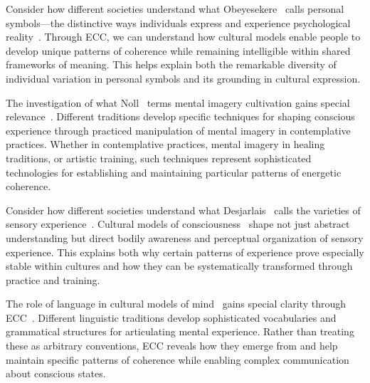 Consider how different societies understand what Obeyesekere~\cite{obeyesekere1981medusa} calls personal symbols—the distinctive ways individuals express and experience psychological reality~\cite{csordas1990embodiment}. Through ECC, we can understand how cultural models enable people to develop unique patterns of coherence while remaining intelligible within shared frameworks of meaning. This helps explain both the remarkable diversity of individual variation in personal symbols and its grounding in cultural expression.

The investigation of what Noll~\cite{noll1985mental} terms mental imagery cultivation gains special relevance~\cite{laughlin1992brain}. Different traditions develop specific techniques for shaping conscious experience through practiced manipulation of mental imagery in contemplative practices. Whether in contemplative practices, mental imagery in healing traditions, or artistic training, such techniques represent sophisticated technologies for establishing and maintaining particular patterns of energetic coherence.

Consider how different societies understand what Desjarlais~\cite{desjarlais1992body} calls the varieties of sensory experience~\cite{howes2003sensual}. Cultural models of consciousness~ shape not just abstract understanding but direct bodily awareness and perceptual organization of sensory experience. This explains both why certain patterns of experience prove especially stable within cultures and how they can be systematically transformed through practice and training.

The role of language in cultural models of mind~ gains special clarity through ECC~\cite{roepstorff2008things,lakoff1999philosophy}. Different linguistic traditions develop sophisticated vocabularies and grammatical structures for articulating mental experience. Rather than treating these as arbitrary conventions, ECC reveals how they emerge from and help maintain specific patterns of coherence while enabling complex communication about conscious states.

